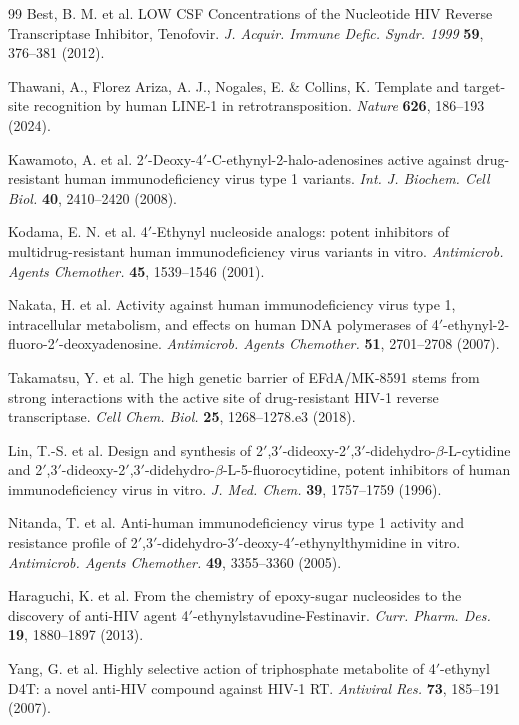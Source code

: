 \documentclass[11pt,twocolumn,twoside]{extarticle}
\begin{document}
\begin{thebibliography}{99}
 Best, B. M. et al. LOW CSF Concentrations of the Nucleotide HIV Reverse Transcriptase Inhibitor, Tenofovir. \textit{J. Acquir. Immune Defic. Syndr. 1999} \textbf{59}, 376--381 (2012).

 Thawani, A., Florez Ariza, A. J., Nogales, E. \& Collins, K. Template and target-site recognition by human LINE-1 in retrotransposition. \textit{Nature} \textbf{626}, 186--193 (2024).

 Kawamoto, A. et al. 2$'$-Deoxy-4$'$-C-ethynyl-2-halo-adenosines active against drug-resistant human immunodeficiency virus type 1 variants. \textit{Int. J. Biochem. Cell Biol.} \textbf{40}, 2410--2420 (2008).

 Kodama, E. N. et al. 4$'$-Ethynyl nucleoside analogs: potent inhibitors of multidrug-resistant human immunodeficiency virus variants in vitro. \textit{Antimicrob. Agents Chemother.} \textbf{45}, 1539--1546 (2001).

 Nakata, H. et al. Activity against human immunodeficiency virus type 1, intracellular metabolism, and effects on human DNA polymerases of 4$'$-ethynyl-2-fluoro-2$'$-deoxyadenosine. \textit{Antimicrob. Agents Chemother.} \textbf{51}, 2701--2708 (2007).

 Takamatsu, Y. et al. The high genetic barrier of EFdA/MK-8591 stems from strong interactions with the active site of drug-resistant HIV-1 reverse transcriptase. \textit{Cell Chem. Biol.} \textbf{25}, 1268--1278.e3 (2018).

 Lin, T.-S. et al. Design and synthesis of 2$'$,3$'$-dideoxy-2$'$,3$'$-didehydro-$\beta$-L-cytidine and 2$'$,3$'$-dideoxy-2$'$,3$'$-didehydro-$\beta$-L-5-fluorocytidine, potent inhibitors of human immunodeficiency virus in vitro. \textit{J. Med. Chem.} \textbf{39}, 1757--1759 (1996).

 Nitanda, T. et al. Anti-human immunodeficiency virus type 1 activity and resistance profile of 2$'$,3$'$-didehydro-3$'$-deoxy-4$'$-ethynylthymidine in vitro. \textit{Antimicrob. Agents Chemother.} \textbf{49}, 3355--3360 (2005).

 Haraguchi, K. et al. From the chemistry of epoxy-sugar nucleosides to the discovery of anti-HIV agent 4$'$-ethynylstavudine-Festinavir. \textit{Curr. Pharm. Des.} \textbf{19}, 1880--1897 (2013).

 Yang, G. et al. Highly selective action of triphosphate metabolite of 4$'$-ethynyl D4T: a novel anti-HIV compound against HIV-1 RT. \textit{Antiviral Res.} \textbf{73}, 185--191 (2007).


\end{thebibliography}
\end{document}
